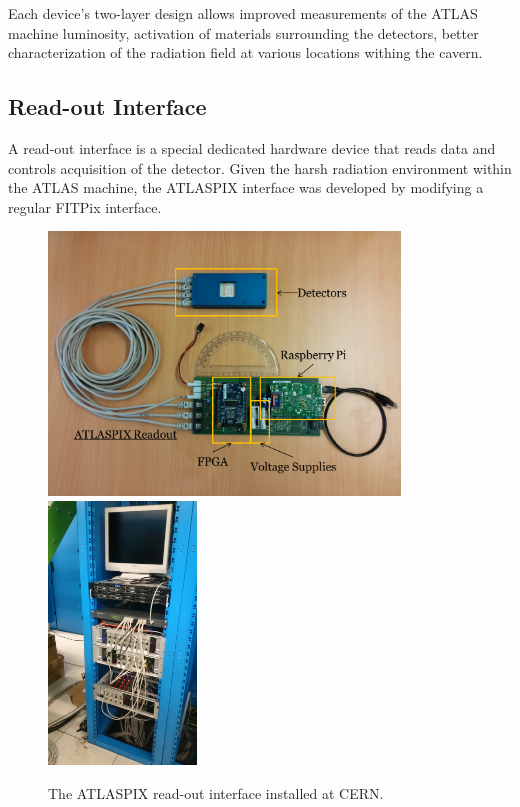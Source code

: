 Each device's two-layer design allows improved measurements of the ATLAS machine luminosity, activation of materials surrounding the detectors, better characterization of the radiation field at various locations withing the cavern.

\subsection{Read-out Interface}
A read-out interface is a special dedicated hardware device that reads data and controls acquisition of the detector. \cite{Pixelman} Given the harsh radiation environment within the ATLAS machine, the ATLASPIX interface was developed by modifying a regular FITPix interface. \cite{FITPix}

\begin{figure}[t]
\begin{center}
\includegraphics[height=7cm]{figures/imported/atlaspix}
\includegraphics[height=7cm]{figures/imported/atlaspix-installed}
\todo %
\caption{The ATLASPIX read-out interface installed at CERN.}
\label{fig:ATLASPIX}
\end{center}
\end{figure}

